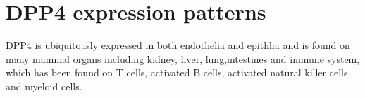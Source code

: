 \section{DPP4 expression patterns}
DPP4 is ubiquitously expressed in both endothelia and epithlia and is found on many mammal organs including kidney, liver, lung,intestines and immune system, which has been found on T cells, activated B cells, activated natural killer cells and myeloid cells.~\cite{Abbott1994,Shingu2003,Hong1989,Gutschmidt1981,Dikov2004,Bühling1995,Tanaka1992,Gorrell1991} 